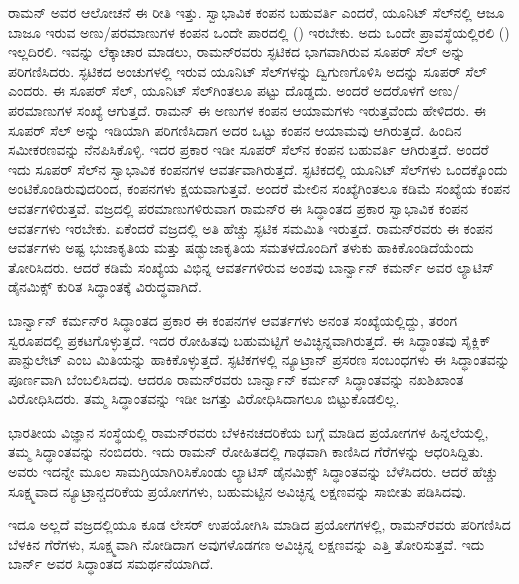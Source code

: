 ರಾಮನ್ ಅವರ ಆಲೋಚನೆ ಈ ರೀತಿ ಇತ್ತು. ಸ್ವಾಭಾವಿಕ ಕಂಪನ ಬಹುವರ್ತಿ ಎಂದರೆ, ಯೂನಿಟ್ ಸೆಲ್‍ನಲ್ಲಿ ಆಜೂ ಬಾಜೂ ಇರುವ ಅಣು/ಪರಮಾಣುಗಳ ಕಂಪನ ಒಂದೇ ಪಾರದಲ್ಲಿ () ಇರಬೇಕು. ಅದು ಒಂದೇ ಪ್ರಾವಸ್ಥೆಯಲ್ಲಿರಲಿ () ಇಲ್ಲದಿರಲಿ. ಇವನ್ನು ಲೆಕ್ಕಾಚಾರ ಮಾಡಲು, ರಾಮನ್‍ರವರು ಸ್ಫಟಿಕದ ಭಾಗವಾಗಿರುವ ಸೂಪರ್ ಸೆಲ್ ಅನ್ನು ಪರಿಗಣಿಸಿದರು. ಸ್ಫಟಿಕದ ಅಂಚುಗಳಲ್ಲಿ ಇರುವ ಯೂನಿಟ್ ಸೆಲ್‍ಗಳನ್ನು ದ್ವಿಗುಣಗೊಳಿಸಿ ಅದನ್ನು ಸೂಪರ್ ಸೆಲ್ ಎಂದರು. ಈ ಸೂಪರ್ ಸೆಲ್, ಯೂನಿಟ್ ಸೆಲ್‍ಗಿಂತಲೂ  ಪಟ್ಟು ದೊಡ್ಡದು. ಅಂದರೆ ಅದರೊಳಗೆ ಅಣು/ಪರಮಾಣುಗಳ ಸಂಖ್ಯೆ  ಆಗುತ್ತದೆ. ರಾಮನ್ ಈ  ಅಣುಗಳ ಕಂಪನ ಆಯಾಮಗಳು  ಇರುತ್ತವೆಂದು ಹೇಳಿದರು. ಈ ಸೂಪರ್ ಸೆಲ್ ಅನ್ನು ಇಡಿಯಾಗಿ ಪರಿಗಣಿಸಿದಾಗ ಅದರ ಒಟ್ಟು ಕಂಪನ ಆಯಾಮವು  ಆಗಿರುತ್ತದೆ. ಹಿಂದಿನ ಸಮೀಕರಣವನ್ನು ನೆನಪಿಸಿಕೊಳ್ಳಿ. ಇದರ ಪ್ರಕಾರ ಇಡೀ ಸೂಪರ್ ಸೆಲ್‍ನ ಕಂಪನ ಬಹುವರ್ತಿ  ಆಗಿರುತ್ತದೆ. ಅಂದರೆ ಇದು ಸೂಪರ್ ಸೆಲ್‍ನ ಸ್ವಾಭಾವಿಕ ಕಂಪನಗಳ ಆವರ್ತವಾಗಿರುತ್ತದೆ. ಸ್ಫಟಿಕದಲ್ಲಿ ಯೂನಿಟ್ ಸೆಲ್‍ಗಳು ಒಂದಕ್ಕೊಂದು ಅಂಟಿಕೊಂಡಿರುವುದರಿಂದ, ಕಂಪನಗಳು ಕ್ಷಯವಾಗುತ್ತವೆ. ಅಂದರೆ ಮೇಲಿನ ಸಂಖ್ಯೆಗಿಂತಲೂ ಕಡಿಮೆ ಸಂಖ್ಯೆಯ ಕಂಪನ ಆವರ್ತಗಳಿರುತ್ತವೆ. ವಜ್ರದಲ್ಲಿ  ಪರಮಾಣುಗಳಿರುವಾಗ ರಾಮನ್‍ರ ಈ ಸಿದ್ಧಾಂತದ ಪ್ರಕಾರ  ಸ್ವಾಭಾವಿಕ ಕಂಪನ ಆವರ್ತಗಳು ಇರಬೇಕು. ಏಕೆಂದರೆ ವಜ್ರದಲ್ಲಿ ಅತಿ ಹೆಚ್ಚು ಸ್ಫಟಿಕ ಸಮಮಿತಿ ಇರುತ್ತದೆ. ರಾಮನ್‍ರವರು ಈ ಕಂಪನ ಆವರ್ತಗಳು ಅಷ್ಟ ಭುಜಾಕೃತಿಯ ಮತ್ತು ಷಡ್ಭುಜಾಕೃತಿಯ ಸಮತಳದೊಂದಿಗೆ ತಳುಕು ಹಾಕಿಕೊಂಡಿದೆಯೆಂದು ತೋರಿಸಿದರು. ಆದರೆ ಕಡಿಮೆ ಸಂಖ್ಯೆಯ ವಿಭಿನ್ನ ಆವರ್ತಗಳಿರುವ ಅಂಶವು ಬಾರ್ನ್\enginline{-}ವಾನ್ ಕಮರ್ನ್ ಅವರ ಲ್ಯಾಟಿಸ್ ಡೈನಮಿಕ್ಸ್ ಕುರಿತ ಸಿದ್ಧಾಂತಕ್ಕೆ ವಿರುದ್ಧವಾಗಿದೆ.

ಬಾರ್ನ್\enginline{-}ವಾನ್ ಕರ್ಮನ್‍ರ ಸಿದ್ಧಾಂತದ ಪ್ರಕಾರ ಈ ಕಂಪನಗಳ ಆವರ್ತಗಳು ಅನಂತ ಸಂಖ್ಯೆಯಲ್ಲಿದ್ದು, ತರಂಗ ಸ್ವರೂಪದಲ್ಲಿ ಪ್ರಕಟಗೊಳ್ಳುತ್ತದೆ. ಇದರ ರೋಹಿತವು ಬಹುಮಟ್ಟಿಗೆ ಅವಿಚ್ಛಿನ್ನವಾಗಿರುತ್ತದೆ. ಈ ಸಿದ್ಧಾಂತವು ಸೈಕ್ಲಿಕ್ ಪಾಸ್ಟುಲೇಟ್ ಎಂಬ ಮಿತಿಯನ್ನು ಹಾಕಿಕೊಳ್ಳುತ್ತದೆ. ಸ್ಫಟಿಕಗಳಲ್ಲಿ ನ್ಯೂಟ್ರಾನ್ ಪ್ರಸರಣ ಸಂಬಂಧಗಳು ಈ ಸಿದ್ಧಾಂತವನ್ನು ಪೂರ್ಣವಾಗಿ ಬೆಂಬಲಿಸಿದವು. ಆದರೂ ರಾಮನ್‍ರವರು ಬಾರ್ನ್\enginline{-}ವಾನ್ ಕರ್ಮನ್ ಸಿದ್ಧಾಂತವನ್ನು ನಖಶಿಖಾಂತ ವಿರೋಧಿಸಿದರು. ತಮ್ಮ ಸಿದ್ಧಾಂತವನ್ನು ಇಡೀ ಜಗತ್ತು ವಿರೋಧಿಸಿದಾಗಲೂ ಬಿಟ್ಟುಕೊಡಲಿಲ್ಲ.

ಭಾರತೀಯ ವಿಜ್ಞಾನ ಸಂಸ್ಥೆಯಲ್ಲಿ ರಾಮನ್‍ರವರು ಬೆಳಕಿನ\enginline{-}ಚದರಿಕೆಯ ಬಗ್ಗೆ ಮಾಡಿದ ಪ್ರಯೋಗಗಳ ಹಿನ್ನಲೆಯಲ್ಲಿ, ತಮ್ಮ ಸಿದ್ಧಾಂತವನ್ನು ನಂಬಿದರು. ಇದು ರಾಮನ್ ರೋಹಿತದಲ್ಲಿ ಗಾಢವಾಗಿ ಕಾಣಿಸಿದ ಗೆರೆಗಳನ್ನು ಆಧರಿಸಿದ್ದಿತು. ಅವರು ಇದನ್ನೇ ಮೂಲ ಸಾಮಗ್ರಿಯಾಗಿರಿಸಿಕೊಂಡು ಲ್ಯಾಟಿಸ್ ಡೈನಮಿಕ್ಸ್ ಸಿದ್ಧಾಂತವನ್ನು ಬೆಳೆಸಿದರು. ಆದರೆ ಹೆಚ್ಚು ಸೂಕ್ಷ್ಮವಾದ ನ್ಯೂಟ್ರಾನ್\enginline{-}ಚದರಿಕೆಯ ಪ್ರಯೋಗಗಳು, ಬಹುಮಟ್ಟಿನ ಅವಿಚ್ಛಿನ್ನ ಲಕ್ಷಣವನ್ನು ಸಾಬೀತು ಪಡಿಸಿದವು.

ಇದೂ ಅಲ್ಲದೆ ವಜ್ರದಲ್ಲಿಯೂ ಕೂಡ ಲೇಸರ್ ಉಪಯೋಗಿಸಿ ಮಾಡಿದ ಪ್ರಯೋಗಗಳಲ್ಲಿ, ರಾಮನ್‍ರವರು ಪರಿಗಣಿಸಿದ ಬೆಳಕಿನ ಗೆರೆಗಳು, ಸೂಕ್ಷ್ಮವಾಗಿ ನೋಡಿದಾಗ ಅವುಗಳೊಡಗಣ ಅವಿಚ್ಛಿನ್ನ ಲಕ್ಷಣವನ್ನು ಎತ್ತಿ ತೋರಿಸುತ್ತವೆ. ಇದು ಬಾರ್ನ್ ಅವರ ಸಿದ್ಧಾಂತದ ಸಮರ್ಥನೆಯಾಗಿದೆ.

